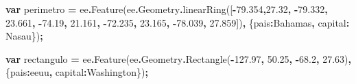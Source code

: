 \documentclass[
  12pt,
  letterpaper,
  twoside]{book}
\newenvironment{Shaded}{\begin{snugshade}}{\end{snugshade}}
\newcommand{\AttributeTok}[1]{\textcolor[rgb]{0.77,0.63,0.00}{#1}}
\newcommand{\DataTypeTok}[1]{\textcolor[rgb]{0.13,0.29,0.53}{#1}}
\newcommand{\FloatTok}[1]{\textcolor[rgb]{0.00,0.00,0.81}{#1}}
\newcommand{\FunctionTok}[1]{\textcolor[rgb]{0.00,0.00,0.00}{#1}}
\newcommand{\KeywordTok}[1]{\textcolor[rgb]{0.13,0.29,0.53}{\textbf{#1}}}
\newcommand{\NormalTok}[1]{#1}
\newcommand{\OperatorTok}[1]{\textcolor[rgb]{0.81,0.36,0.00}{\textbf{#1}}}
\newcommand{\StringTok}[1]{\textcolor[rgb]{0.31,0.60,0.02}{#1}}
\begin{document}
\begin{Shaded}
\begin{Highlighting}[]
\KeywordTok{var}\NormalTok{ perimetro }\OperatorTok{=}\NormalTok{ ee}\OperatorTok{.}\FunctionTok{Feature}\NormalTok{(ee}\OperatorTok{.}\AttributeTok{Geometry}\OperatorTok{.}\FunctionTok{linearRing}\NormalTok{([}\OperatorTok{{-}}\FloatTok{79.354}\OperatorTok{,}\FloatTok{27.32}\OperatorTok{,}
                                   \OperatorTok{{-}}\FloatTok{79.332}\OperatorTok{,} \FloatTok{23.661}\OperatorTok{,}
                                   \OperatorTok{{-}}\FloatTok{74.19}\OperatorTok{,} \FloatTok{21.161}\OperatorTok{,}
                                   \OperatorTok{{-}}\FloatTok{72.235}\OperatorTok{,} \FloatTok{23.165}\OperatorTok{,}
                                   \OperatorTok{{-}}\FloatTok{78.039}\OperatorTok{,} \FloatTok{27.859}\NormalTok{])}\OperatorTok{,}
\NormalTok{        \{}\DataTypeTok{pais}\OperatorTok{:}\StringTok{\textquotesingle{}Bahamas\textquotesingle{}}\OperatorTok{,}
\DataTypeTok{capital}\OperatorTok{:} \StringTok{\textquotesingle{}Nasau\textquotesingle{}}\NormalTok{\})}\OperatorTok{;}

\KeywordTok{var}\NormalTok{ rectangulo }\OperatorTok{=}\NormalTok{ ee}\OperatorTok{.}\FunctionTok{Feature}\NormalTok{(ee}\OperatorTok{.}\AttributeTok{Geometry}\OperatorTok{.}\FunctionTok{Rectangle}\NormalTok{(}\OperatorTok{{-}}\FloatTok{127.97}\OperatorTok{,} \FloatTok{50.25}\OperatorTok{,}
                                  \OperatorTok{{-}}\FloatTok{68.2}\OperatorTok{,} \FloatTok{27.63}\NormalTok{)}\OperatorTok{,}
\NormalTok{        \{}\DataTypeTok{pais}\OperatorTok{:}\StringTok{\textquotesingle{}eeuu\textquotesingle{}}\OperatorTok{,} 
\DataTypeTok{capital}\OperatorTok{:}\StringTok{\textquotesingle{}Washington\textquotesingle{}}\NormalTok{\})}\OperatorTok{;} 


\end{Highlighting}
\end{Shaded}
\end{document}
